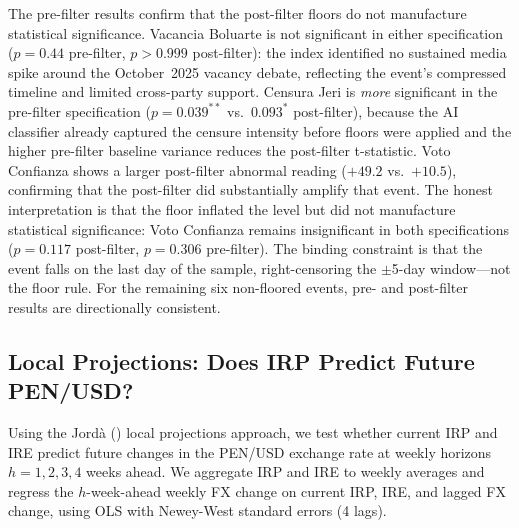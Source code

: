 \documentclass[12pt,a4paper]{article}
\begin{document}
The pre-filter results confirm that the post-filter floors do not manufacture
statistical significance.  Vacancia Boluarte is not significant in either
specification ($p = 0.44$ pre-filter, $p > 0.999$ post-filter): the index
identified no sustained media spike around the October~2025 vacancy debate,
reflecting the event's compressed timeline and limited cross-party support.
Censura Jeri is \emph{more} significant in the pre-filter specification
($p = 0.039^{**}$ vs.\ $0.093^{*}$ post-filter), because the AI classifier
already captured the censure intensity before floors were applied and the
higher pre-filter baseline variance reduces the post-filter t-statistic.
Voto Confianza shows a larger post-filter abnormal reading ($+49.2$ vs.\
$+10.5$), confirming that the post-filter did substantially amplify that
event.  The honest interpretation is that the floor inflated the level but
did not manufacture statistical significance: Voto Confianza remains
insignificant in both specifications ($p = 0.117$ post-filter, $p = 0.306$
pre-filter).  The binding constraint is that the event falls on the last day
of the sample, right-censoring the $\pm$5-day window---not the floor rule.
For the remaining six non-floored events, pre- and post-filter results are
directionally consistent.

\subsection{Local Projections: Does IRP Predict Future PEN/USD?}
\label{subsec:lp}

Using the Jord\`{a} (\citeyear{jorda2005}) local projections approach, we
test whether current IRP and IRE predict future changes in the PEN/USD
exchange rate at weekly horizons $h = 1, 2, 3, 4$ weeks ahead.  We
aggregate IRP and IRE to weekly averages and regress the $h$-week-ahead
weekly FX change on current IRP, IRE, and lagged FX change, using OLS with
Newey-West standard errors (4 lags).
\end{document}
